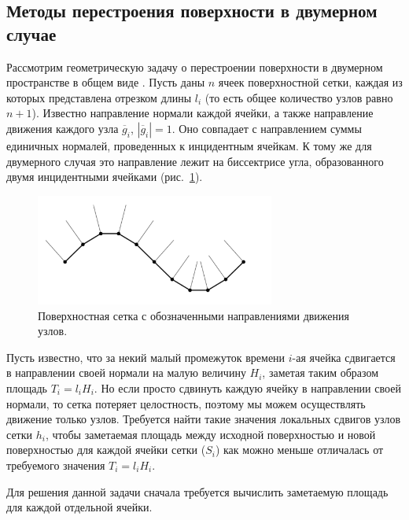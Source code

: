 \subsection{Методы перестроения поверхности в двумерном \\ случае}

Рассмотрим геометрическую задачу о перестроении поверхности в двумерном пространстве в общем виде \cite{Rybakov2019Geo2D}.
Пусть даны $n$ ячеек поверхностной сетки, каждая из которых представлена отрезком длины $l_i$ (то есть общее количество узлов равно $n + 1$).
Известно направление нормали каждой ячейки, а также направление движения каждого узла $\overline{g}_i$, $|\overline{g}_i| = 1$.
Оно совпадает с направлением суммы единичных нормалей, проведенных к инцидентным ячейкам.
К тому же для двумерного случая это направление лежит на биссектрисе угла, образованного двумя инцидентными ячейками \cite{Fortin2004Remesh2d} (рис.~\ref{fig:text_1_remesh_2d_grid_normals}).

\begin{figure}[ht]
\centering
\includegraphics[width=0.7\textwidth]{pics/text_1_remesh_2d/grid_normals.pdf}
\singlespacing
{}\caption{Поверхностная сетка с обозначенными направлениями движения узлов.}
\label{fig:text_1_remesh_2d_grid_normals}
\end{figure}

Пусть известно, что за некий малый промежуток времени $i$-ая ячейка сдвигается в направлении своей нормали на малую величину $H_i$, заметая таким образом площадь $T_i = l_i H_i$.
Но если просто сдвинуть каждую ячейку в направлении своей нормали, то сетка потеряет целостность, поэтому мы можем осуществлять движение только узлов.
Требуется найти такие значения локальных сдвигов узлов сетки $h_i$, чтобы заметаемая площадь между исходной поверхностью и новой поверхностью для каждой ячейки сетки ($S_i$) как можно меньше отличалась от требуемого значения $T_i = l_iH_i$.

Для решения данной задачи сначала требуется вычислить заметаемую площадь для каждой отдельной ячейки.


